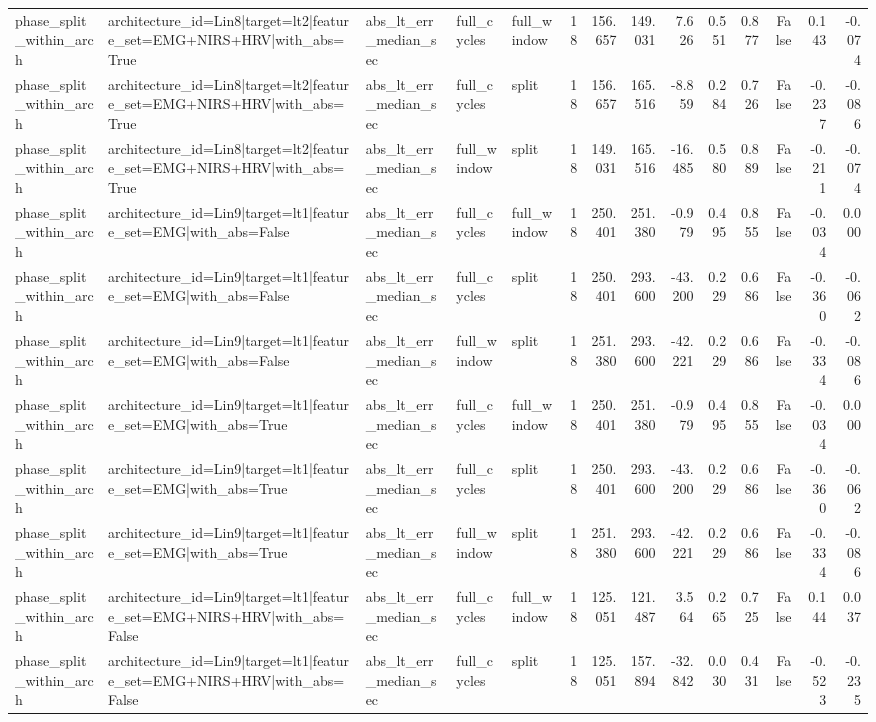 \begin{table}
\begin{tabular}{lllllrrrrrrrrr}
phase_split_within_arch & architecture_id=Lin8|target=lt2|feature_set=EMG+NIRS+HRV|with_abs=True & abs_lt_err_median_sec & full_cycles & full_window & 18 & 156.657 & 149.031 & 7.626 & 0.551 & 0.877 & False & 0.143 & -0.074 \\
phase_split_within_arch & architecture_id=Lin8|target=lt2|feature_set=EMG+NIRS+HRV|with_abs=True & abs_lt_err_median_sec & full_cycles & split & 18 & 156.657 & 165.516 & -8.859 & 0.284 & 0.726 & False & -0.237 & -0.086 \\
phase_split_within_arch & architecture_id=Lin8|target=lt2|feature_set=EMG+NIRS+HRV|with_abs=True & abs_lt_err_median_sec & full_window & split & 18 & 149.031 & 165.516 & -16.485 & 0.580 & 0.889 & False & -0.211 & -0.074 \\
phase_split_within_arch & architecture_id=Lin9|target=lt1|feature_set=EMG|with_abs=False & abs_lt_err_median_sec & full_cycles & full_window & 18 & 250.401 & 251.380 & -0.979 & 0.495 & 0.855 & False & -0.034 & 0.000 \\
phase_split_within_arch & architecture_id=Lin9|target=lt1|feature_set=EMG|with_abs=False & abs_lt_err_median_sec & full_cycles & split & 18 & 250.401 & 293.600 & -43.200 & 0.229 & 0.686 & False & -0.360 & -0.062 \\
phase_split_within_arch & architecture_id=Lin9|target=lt1|feature_set=EMG|with_abs=False & abs_lt_err_median_sec & full_window & split & 18 & 251.380 & 293.600 & -42.221 & 0.229 & 0.686 & False & -0.334 & -0.086 \\
phase_split_within_arch & architecture_id=Lin9|target=lt1|feature_set=EMG|with_abs=True & abs_lt_err_median_sec & full_cycles & full_window & 18 & 250.401 & 251.380 & -0.979 & 0.495 & 0.855 & False & -0.034 & 0.000 \\
phase_split_within_arch & architecture_id=Lin9|target=lt1|feature_set=EMG|with_abs=True & abs_lt_err_median_sec & full_cycles & split & 18 & 250.401 & 293.600 & -43.200 & 0.229 & 0.686 & False & -0.360 & -0.062 \\
phase_split_within_arch & architecture_id=Lin9|target=lt1|feature_set=EMG|with_abs=True & abs_lt_err_median_sec & full_window & split & 18 & 251.380 & 293.600 & -42.221 & 0.229 & 0.686 & False & -0.334 & -0.086 \\
phase_split_within_arch & architecture_id=Lin9|target=lt1|feature_set=EMG+NIRS+HRV|with_abs=False & abs_lt_err_median_sec & full_cycles & full_window & 18 & 125.051 & 121.487 & 3.564 & 0.265 & 0.725 & False & 0.144 & 0.037 \\
phase_split_within_arch & architecture_id=Lin9|target=lt1|feature_set=EMG+NIRS+HRV|with_abs=False & abs_lt_err_median_sec & full_cycles & split & 18 & 125.051 & 157.894 & -32.842 & 0.030 & 0.431 & False & -0.523 & -0.235 \\

\end{tabular}
\end{table}

